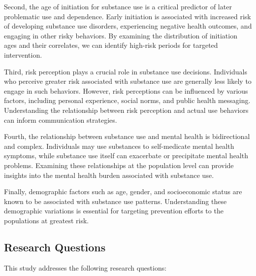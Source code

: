 \documentclass[conference]{IEEEtran}
\begin{document}
Second, the age of initiation for substance use is a critical predictor of later problematic use and dependence. Early initiation is associated with increased risk of developing substance use disorders, experiencing negative health outcomes, and engaging in other risky behaviors. By examining the distribution of initiation ages and their correlates, we can identify high-risk periods for targeted intervention.

Third, risk perception plays a crucial role in substance use decisions. Individuals who perceive greater risk associated with substance use are generally less likely to engage in such behaviors. However, risk perceptions can be influenced by various factors, including personal experience, social norms, and public health messaging. Understanding the relationship between risk perception and actual use behaviors can inform communication strategies.

Fourth, the relationship between substance use and mental health is bidirectional and complex. Individuals may use substances to self-medicate mental health symptoms, while substance use itself can exacerbate or precipitate mental health problems. Examining these relationships at the population level can provide insights into the mental health burden associated with substance use.

Finally, demographic factors such as age, gender, and socioeconomic status are known to be associated with substance use patterns. Understanding these demographic variations is essential for targeting prevention efforts to the populations at greatest risk.

\subsection{Research Questions}

This study addresses the following research questions:
\end{document}
